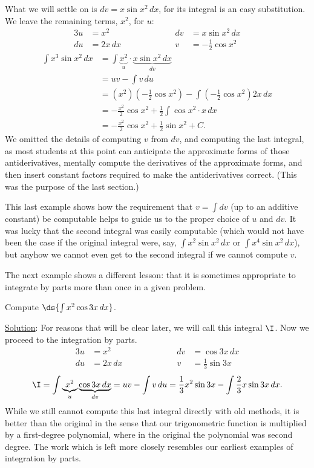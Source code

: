 What we will settle on is $dv=x\sin x^2\,dx$, for its integral
is an easy substitution.  We leave the remaining terms, $x^2$,
for $u$:
\begin{alignat*}{3}
u&=x^2&&\qquad\qquad&dv&=x\sin x^2\,dx\\
du&=2x\,dx&&&v&=-\frac12\cos x^2\end{alignat*}
\begin{align*}
\int x^3\sin x^2\,dx&=\int \underbrace{x^2}_{u}
                       \cdot \underbrace{x\sin x^2\,dx}_{dv}\\
                    &=uv-\int v\,du\\
                    &=(x^2)\left(-\frac12\cos x^2\right)
                        -\int\left(-\frac12\cos x^2\right)2x\,dx\\
                    &=-\frac{x^2}{2}\cos x^2+\frac12\int \cos x^2\cdot x\,dx\\
                    &=-\frac{x^2}{2}\cos x^2+\frac12\sin x^2+C.
\end{align*}
We omitted the details of computing $v$ from $dv$, and computing the
last integral, as most students at this point can anticipate the
approximate forms of those antiderivatives, mentally compute
the derivatives of the approximate forms, and then insert constant factors
required to make the antiderivatives correct.  (This was 
the purpose of the last section.)
\eex

This last example shows how the requirement that $v=\int dv$ (up
to an additive constant) be computable helps to guide us to 
the proper choice of $u$ and $dv$.  It was lucky that the second integral
was easily computable (which would not have been the case
if the original integral were, say, $\int x^2\sin x^2\,dx$
or $\int x^4\sin x^2\,dx$), but anyhow we cannot even get
to the second integral if we cannot compute $v$.

 The next example shows a different lesson:
that it is sometimes appropriate to integrate by parts more than once
in a given problem.

\bex Compute $\ds{\int x^2\cos 3x\,dx}$.

\underline{Solution}: For reasons that will be clear later, 
we will call this integral $\I$.  Now we proceed to the 
integration by parts.
\begin{alignat*}{3}
u&=x^2&&\qquad\qquad&dv&=\cos3 x\,dx\\
du&=2x\,dx&&&v&=\frac13\sin3x\end{alignat*}
$$\I=\int \underbrace{x^2}_{u}\underbrace{\cos 3x\,dx}_{dv}
=uv-\int v\,du
=\frac13x^2\sin 3x-\int\frac23x\sin3x\,dx.
$$
While we still cannot compute this last integral directly with old methods,
it is better than the original in the sense that
our trigonometric function is multiplied by a first-degree polynomial,
where in the original the polynomial was second degree.
The work which is left more closely resembles our earliest examples
of integration by parts.  

